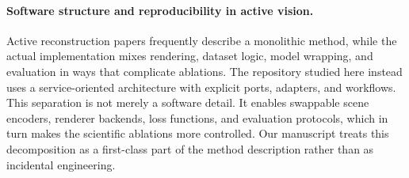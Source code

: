 \paragraph{Software structure and reproducibility in active vision.}
Active reconstruction papers frequently describe a monolithic method, while the actual implementation mixes rendering, dataset logic, model wrapping, and evaluation in ways that complicate ablations. The repository studied here instead uses a service-oriented architecture with explicit ports, adapters, and workflows. This separation is not merely a software detail. It enables swappable scene encoders, renderer backends, loss functions, and evaluation protocols, which in turn makes the scientific ablations more controlled. Our manuscript treats this decomposition as a first-class part of the method description rather than as incidental engineering.
